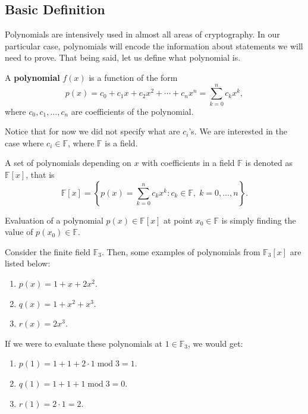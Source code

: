 \documentclass[../lecture-notes-148x210.tex]{subfiles}
\begin{document}
\subsection{Basic Definition}

Polynomials are intensively used in almost all areas of cryptography. In our particular case, polynomials will encode the information about
statements we will need to prove. That being said, let us define what polynomial is.

\begin{definition}
    A \textbf{polynomial} $f(x)$ is a function of the form
    \begin{equation*}
        p(x) = c_0 + c_1 x + c_2 x^2 + \cdots + c_n x^n = \sum_{k=0}^{n} c_k x^k,
    \end{equation*}
    where $c_0, c_1, \dots, c_n$ are coefficients of the polynomial.
\end{definition}

Notice that for now we did not specify what are $c_i$'s. We are interested in the case where $c_i \in \mathbb{F}$, where $\mathbb{F}$ is a field. 

\begin{definition}
    A set of polynomials depending on $x$ with coefficients in a field $\mathbb{F}$ is denoted as $\mathbb{F}[x]$, that is
    \begin{equation*}
        \mathbb{F}[x] = \left\{p(x) = \sum_{k=0}^{n} c_k x^k: c_k \in \mathbb{F}, \; k = 0,\dots,n\right\}.
    \end{equation*}
\end{definition}

\begin{definition}
    Evaluation of a polynomial $p(x) \in \mathbb{F}[x]$ at point $x_0 \in \mathbb{F}$ is simply finding the value of $p(x_0) \in \mathbb{F}$.
\end{definition}

\begin{example}
    Consider the finite field $\mathbb{F}_3$. Then, some examples of polynomials from $\mathbb{F}_3[x]$ are listed below:
    \begin{enumerate}
        \item $p(x) = 1 + x + 2x^2$.
        \item $q(x) = 1 + x^2 + x^3$.
        \item $r(x) = 2x^3$.
    \end{enumerate}

   If we were to evaluate these polynomials at $1 \in \mathbb{F}_3$, we would get:
    \begin{enumerate}
        \item $p(1) = 1 + 1 + 2 \cdot 1 \; \text{mod} \; 3 = 1$.
        \item $q(1) = 1 + 1 + 1 \; \text{mod} \; 3 = 0$.
        \item $r(1) = 2 \cdot 1 = 2$.
    \end{enumerate}
\end{example}
\end{document}
